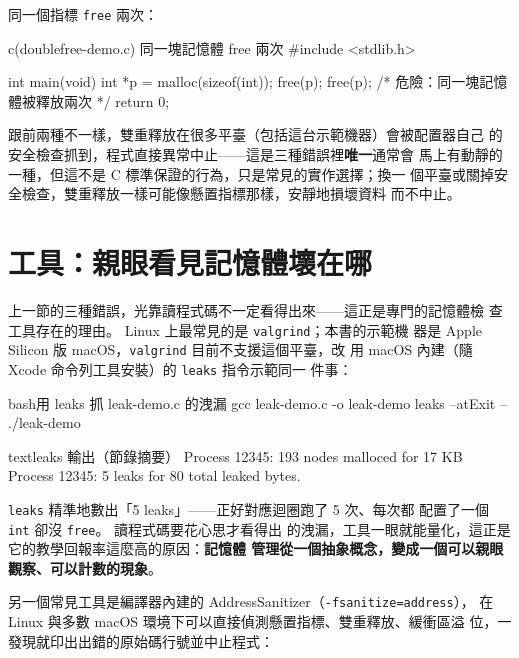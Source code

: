 同一個指標 \texttt{free} 兩次：

\begin{example}{c}{(doublefree-demo.c) 同一塊記憶體 free 兩次}
#include <stdlib.h>

int main(void) {
    int *p = malloc(sizeof(int));
    free(p);
    free(p); /* 危險：同一塊記憶體被釋放兩次 */
    return 0;
}
\end{example}

跟前兩種不一樣，雙重釋放在很多平臺（包括這台示範機器）會被配置器自己
的安全檢查抓到，程式直接異常中止——這是三種錯誤裡\textbf{唯一}通常會
馬上有動靜的一種，但這不是 C 標準保證的行為，只是常見的實作選擇；換一
個平臺或關掉安全檢查，雙重釋放一樣可能像懸置指標那樣，安靜地損壞資料
而不中止。


\section{工具：親眼看見記憶體壞在哪}
\label{sec:ds-tools}

上一節的三種錯誤，光靠讀程式碼不一定看得出來——這正是專門的記憶體檢
查工具存在的理由。 Linux 上最常見的是 \texttt{valgrind}；本書的示範機
器是 Apple Silicon 版 macOS，\texttt{valgrind} 目前不支援這個平臺，改
用 macOS 內建（隨 Xcode 命令列工具安裝）的 \texttt{leaks} 指令示範同一
件事：

\begin{code}{bash}{用 leaks 抓 leak-demo.c 的洩漏}
gcc leak-demo.c -o leak-demo
leaks --atExit -- ./leak-demo
\end{code}

\begin{code}{text}{leaks 輸出（節錄摘要）}
Process 12345: 193 nodes malloced for 17 KB
Process 12345: 5 leaks for 80 total leaked bytes.
\end{code}

\texttt{leaks} 精準地數出「5 leaks」——正好對應迴圈跑了 5 次、每次都
配置了一個 \texttt{int} 卻沒 \texttt{free}。 讀程式碼要花心思才看得出
的洩漏，工具一眼就能量化，這正是它的教學回報率這麼高的原因：\textbf{記憶體
管理從一個抽象概念，變成一個可以親眼觀察、可以計數的現象}。

另一個常見工具是編譯器內建的 AddressSanitizer（\texttt{-fsanitize=address}），
在 Linux 與多數 macOS 環境下可以直接偵測懸置指標、雙重釋放、緩衝區溢
位，一發現就印出出錯的原始碼行號並中止程式：

